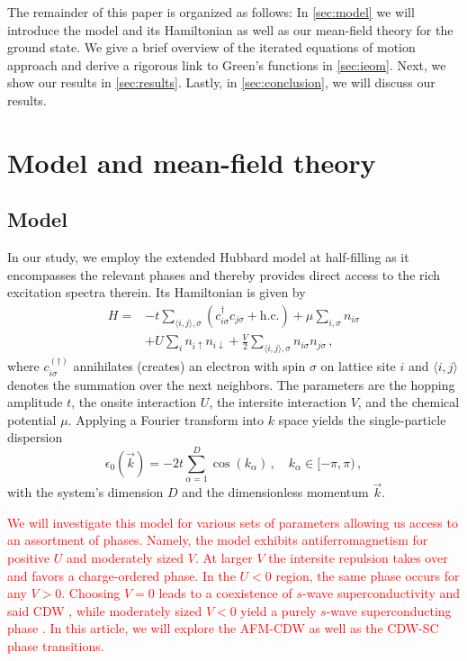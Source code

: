 \documentclass[
    reprint, 
    aps,
    preprintnumbers,
    twocolumn,
    prb,
    superscriptaddress
]{revtex4-2}
\newcommand{\vk}{\vec{k}}
\begin{document}
The remainder of this paper is organized as follows:
In \autoref{sec:model} we will introduce the model and its Hamiltonian as well as our mean-field theory for the ground state.
We give a brief overview of the iterated equations of motion approach and derive a rigorous link to Green's functions in \autoref{sec:ieom}.
Next, we show our results in \autoref{sec:results}.
Lastly, in \autoref{sec:conclusion}, we will discuss our results.

\section{Model and mean-field theory}\label{sec:model}

\subsection{Model}

In our study, we employ the extended Hubbard model at half-filling as it encompasses the relevant phases and thereby provides direct access to the rich excitation spectra therein.
Its Hamiltonian is given by
\begin{equation}
    \label{eqn:full_hamiltonian}
    \begin{aligned}
        H = &-t \sum_{\langle i, j \rangle, \sigma} \left( c_{i\sigma}^\dagger c_{j\sigma} + \text{h.c.} \right) 
        + \mu \sum_{i,\sigma} n_{i\sigma} \\
        &+ U \sum_{i} n_{i\uparrow} n_{i\downarrow} 
        + \frac{V}{2} \sum_{\langle i, j\rangle, \sigma} n_{i\sigma} n_{j\sigma}\,,
    \end{aligned}
\end{equation}
where $c_{i\sigma}^{(\dagger)}$ annihilates (creates) an electron with spin $\sigma$ on lattice site $i$ 
and $\langle i, j\rangle$ denotes the summation over the next neighbors.
The parameters are the hopping amplitude $t$, the onsite interaction $U$, the intersite interaction $V$, and the chemical potential $\mu$.
Applying a Fourier transform into $k$ space yields the single-particle dispersion 
\begin{equation}
    \epsilon_0 (\vk) = -2t \sum_{\alpha=1}^D \cos(k_\alpha)\,,\quad k_\alpha \in [-\pi, \pi)\,,
\end{equation}
with the system's dimension $D$ and the dimensionless momentum $\vk$.

\textcolor{red}{We will investigate this model for various sets of parameters allowing us access to an assortment of phases.
Namely, the model exhibits antiferromagnetism for positive $U$ and moderately sized $V$.
At larger $V$ the intersite repulsion takes over and favors a charge-ordered phase.
In the $U<0$ region, the same phase occurs for any $V>0$.
Choosing $V=0$ leads to a coexistence of $s$-wave superconductivity and said CDW \cite{yang90}, while moderately sized $V<0$ yield a purely $s$-wave superconducting phase \cite{Micnas88b}.
In this article, we will explore the AFM-CDW as well as the CDW-SC phase transitions.}
\end{document}
